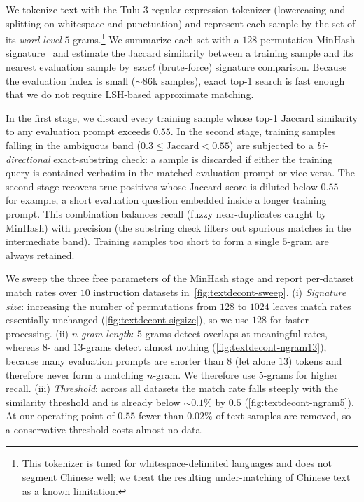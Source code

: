 We tokenize text with the Tulu-3 regular-expression tokenizer (lowercasing and splitting on whitespace and punctuation) and represent each sample by the set of its \emph{word-level} $5$-grams.\footnote{This tokenizer is tuned for whitespace-delimited languages and does not segment Chinese well; we treat the resulting under-matching of Chinese text as a known limitation.} We summarize each set with a $128$-permutation MinHash signature~\citep{broder1997resemblance} and estimate the Jaccard similarity between a training sample and its nearest evaluation sample by \emph{exact} (brute-force) signature comparison. Because the evaluation index is small (${\sim}86$k samples), exact top-1 search is fast enough that we do not require LSH-based approximate matching.

In the first stage, we discard every training sample whose top-1 Jaccard similarity to any evaluation prompt exceeds $0.55$. In the second stage, training samples falling in the ambiguous band ($0.3 \leq \text{Jaccard} < 0.55$) are subjected to a \emph{bi-directional} exact-substring check: a sample is discarded if either the training query is contained verbatim in the matched evaluation prompt or vice versa. The second stage recovers true positives whose Jaccard score is diluted below $0.55$---for example, a short evaluation question embedded inside a longer training prompt. This combination balances recall (fuzzy near-duplicates caught by MinHash) with precision (the substring check filters out spurious matches in the intermediate band). Training samples too short to form a single $5$-gram are always retained.

We sweep the three free parameters of the MinHash stage and report per-dataset match rates over $10$ instruction datasets in~\cref{fig:textdecont-sweep}. (i) \emph{Signature size}: increasing the number of permutations from $128$ to $1024$ leaves match rates essentially unchanged (\cref{fig:textdecont-sigsize}), so we use $128$ for faster processing. (ii) \emph{$n$-gram length}: $5$-grams detect overlaps at meaningful rates, whereas $8$- and $13$-grams detect almost nothing (\cref{fig:textdecont-ngram13}), because many evaluation prompts are shorter than $8$ (let alone $13$) tokens and therefore never form a matching $n$-gram. We therefore use $5$-grams for higher recall. (iii) \emph{Threshold}: across all datasets the match rate falls steeply with the similarity threshold and is already below ${\sim}0.1\%$ by $0.5$ (\cref{fig:textdecont-ngram5}). At our operating point of $0.55$ fewer than $0.02\%$ of text samples are removed, so a conservative threshold costs almost no data.

